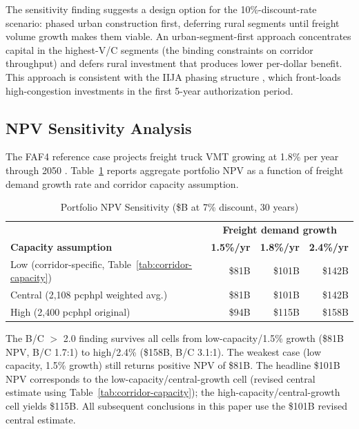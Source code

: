 The sensitivity finding suggests a design option for the 10\%-discount-rate scenario: phased urban construction first, deferring rural segments until freight volume growth makes them viable. An urban-segment-first approach concentrates capital in the highest-V/C segments (the binding constraints on corridor throughput) and defers rural investment that produces lower per-dollar benefit. This approach is consistent with the IIJA phasing structure \citep{IIJA2021}, which front-loads high-congestion investments in the first 5-year authorization period.

\subsection{NPV Sensitivity Analysis}
\label{sec:npv-sensitivity}

The FAF4 reference case projects freight truck VMT growing at 1.8\% per year
through 2050 \citep{FAF5_2023}. Table~\ref{tab:npv-sensitivity} reports aggregate
portfolio NPV as a function of freight demand growth rate and corridor capacity
assumption.

\begin{table}[h!]
\centering
\caption{Portfolio NPV Sensitivity (\$B at 7\% discount, 30 years)}
\label{tab:npv-sensitivity}
\begin{tabular}{lrrr}
\toprule
& \multicolumn{3}{c}{\textbf{Freight demand growth}} \\
\textbf{Capacity assumption} & \textbf{1.5\%/yr} & \textbf{1.8\%/yr} & \textbf{2.4\%/yr} \\
\midrule
Low (corridor-specific, Table~\ref{tab:corridor-capacity}) & \$81B & \$101B & \$142B \\
Central (2,108 pcphpl weighted avg.)                       & \$81B & \$101B & \$142B \\
High (2,400 pcphpl original)                               & \$94B & \$115B & \$158B \\
\bottomrule
\end{tabular}
\end{table}

The B/C $>$ 2.0 finding survives all cells from low-capacity/1.5\% growth (\$81B NPV,
B/C 1.7:1) to high/2.4\% (\$158B, B/C 3.1:1). The weakest case (low capacity, 1.5\%
growth) still returns positive NPV of \$81B. The headline \$101B NPV corresponds to the
low-capacity/central-growth cell (revised central estimate using Table~\ref{tab:corridor-capacity});
the high-capacity/central-growth cell yields \$115B. All subsequent conclusions in this paper use the \$101B revised central estimate.

